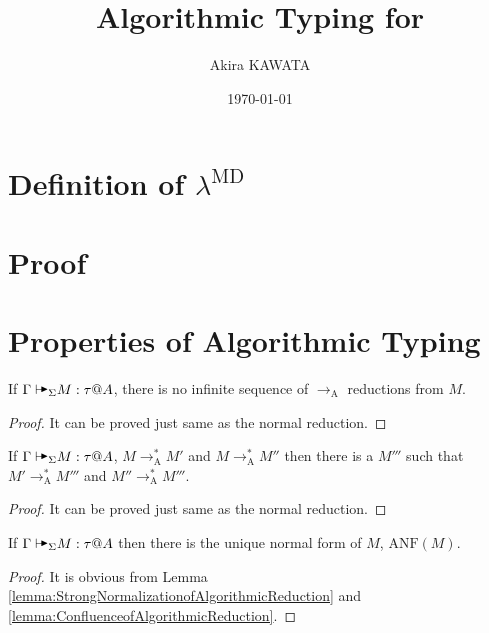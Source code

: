 \documentclass[9pt, a4paper]{extarticle}
\title{Algorithmic Typing for \LMD}
\author{Akira KAWATA}
\date{\today}
\theoremstyle{break}
\newcommand{\G}{\Gamma}
\newcommand{\TB}{{\mathop{\blacktriangleright}}}
\newcommand{\RA}{\longrightarrow_{\text{A}}}
\newcommand{\AV}{\vdash\!\!\!\raisebox{0.4ex}{\scalebox{0.7}{$\TB$}}}
\newcommand{\AVS}{\AV_\Sigma\xspace}
\newcommand{\ANF}{\text{ANF}}
\begin{document}
\maketitle

\section{Definition of \(\lambda^\text{MD}\)}


\section{Proof}


\section{Properties of Algorithmic Typing}

\begin{lemma}
    \label{lemma:StrongNormalizationofAlgorithmicReduction}
    If \( \G \AVS M :\tau @ A\), there is no infinite sequence of \( \RA \) reductions from \( M \).
\end{lemma}

\begin{proof}
    It can be proved just same as the normal reduction.
\end{proof}

\begin{lemma}
    \label{lemma:ConfluenceofAlgorithmicReduction}
    If \( \G \AVS M :\tau @ A\), \( M \RA^* M' \) and \(M \RA^* M''\)
    then there is a \( M''' \) such that \( M' \RA^* M''' \) and \( M'' \RA^* M''' \).
\end{lemma}

\begin{proof}
    It can be proved just same as the normal reduction.
\end{proof}

\begin{lemma}
    \label{lemma:UniquenessofAlgorithmicReduction}
    If \( \G \AVS M : \tau @ A \) then there is the unique normal form of \( M \), \( \ANF(M) \).
\end{lemma}

\begin{proof}
    It is obvious from Lemma \ref{lemma:StrongNormalizationofAlgorithmicReduction} and \ref{lemma:ConfluenceofAlgorithmicReduction}.
\end{proof}
\end{document}
